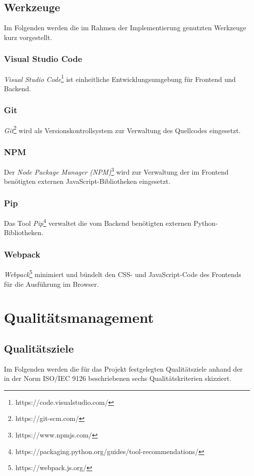 \documentclass[a4paper,11pt,listof=numbered,glossary=totoc,parskip=half,toc=bib]{scrreprt}
\begin{document}
	\section{Werkzeuge}
	Im Folgenden werden die im Rahmen der Implementierung genutzten Werkzeuge kurz vorgestellt.
	
	\subsection{Visual Studio Code}
	\textit{Visual Studio Code}\footnote{https://code.visualstudio.com/} ist einheitliche Entwicklungsumgebung für Frontend und Backend.
	
	\subsection{Git}
	\textit{Git}\footnote{https://git-scm.com/} wird als Versionskontrollsystem zur Verwaltung des Quellcodes eingesetzt.
	
	\subsection{NPM}
	Der \textit{Node Package Manager (NPM)}\footnote{https://www.npmjs.com/} wird zur Verwaltung der im Frontend benötigten externen JavaScript-Bibliotheken eingesetzt.
	
	\subsection{Pip}
	Das Tool \textit{Pip}\footnote{https://packaging.python.org/guides/tool-recommendations/} verwaltet die vom Backend benötigten externen Python-Bibliotheken.
	
	\subsection{Webpack}
	\textit{Webpack}\footnote{https://webpack.js.org/} minimiert und bündelt den CSS- und JavaScript-Code des Frontends für die Ausführung im Browser.
	

	\chapter{Qualitätsmanagement}
	
	\section{Qualitätsziele}
	Im Folgenden werden die für das Projekt festgelegten Qualitätsziele anhand der in der Norm ISO/IEC 9126 beschriebenen sechs Qualitätskriterien skizziert.
	
\end{document}
